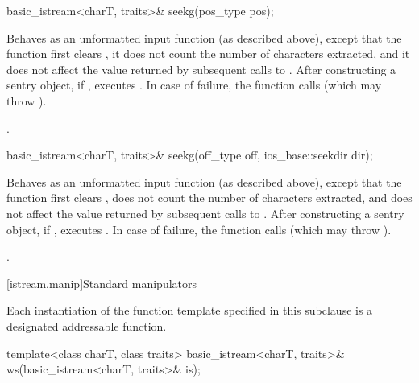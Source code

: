%
\begin{itemdecl}
basic_istream<charT, traits>& seekg(pos_type pos);
\end{itemdecl}

\begin{itemdescr}
\pnum
\effects
Behaves as an unformatted input function (as described above), except that
the function first clears ,
it does not count
the number of characters extracted, and it does not affect the value
returned by subsequent calls to
.
After constructing a sentry object, if
,
executes
.
In case of failure, the function calls
(which may throw
).

\pnum
\returns
{}.
\end{itemdescr}

%
\begin{itemdecl}
basic_istream<charT, traits>& seekg(off_type off, ios_base::seekdir dir);
\end{itemdecl}

\begin{itemdescr}
\pnum
\effects
Behaves as an unformatted input function (as described above), except that the function first clears ,
does not count the number of characters extracted, and
does not affect the value returned by subsequent calls to .
After constructing a sentry object, if
,
executes
.
In case of failure, the function calls  (which may throw
).

\pnum
\returns
{}.
\end{itemdescr}

[istream.manip]{Standard  manipulators}

\pnum
Each instantiation of the function template
specified in this subclause
is a designated addressable function.

\begin{indexed}{}
\begin{itemdecl}
template<class charT, class traits>
  basic_istream<charT, traits>& ws(basic_istream<charT, traits>& is);
\end{itemdecl}
\end{indexed}

